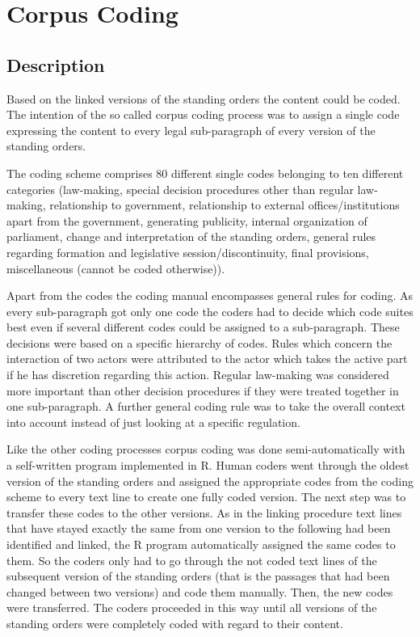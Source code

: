 \documentclass[10pt,]{article}
\begin{document}
\newpage

\section{Corpus Coding}\label{corpus-coding}

\subsection{Description}\label{description-2}

Based on the linked versions of the standing orders the content could be
coded. The intention of the so called corpus coding process was to
assign a single code expressing the content to every legal sub-paragraph
of every version of the standing orders.

The coding scheme comprises 80 different single codes belonging to ten
different categories (law-making, special decision procedures other than
regular law-making, relationship to government, relationship to external
offices/institutions apart from the government, generating publicity,
internal organization of parliament, change and interpretation of the
standing orders, general rules regarding formation and legislative
session/discontinuity, final provisions, miscellaneous (cannot be coded
otherwise)).

Apart from the codes the coding manual encompasses general rules for
coding. As every sub-paragraph got only one code the coders had to
decide which code suites best even if several different codes could be
assigned to a sub-paragraph. These decisions were based on a specific
hierarchy of codes. Rules which concern the interaction of two actors
were attributed to the actor which takes the active part if he has
discretion regarding this action. Regular law-making was considered more
important than other decision procedures if they were treated together
in one sub-paragraph. A further general coding rule was to take the
overall context into account instead of just looking at a specific
regulation.

Like the other coding processes corpus coding was done
semi-automatically with a self-written program implemented in R. Human
coders went through the oldest version of the standing orders and
assigned the appropriate codes from the coding scheme to every text line
to create one fully coded version. The next step was to transfer these
codes to the other versions. As in the linking procedure text lines that
have stayed exactly the same from one version to the following had been
identified and linked, the R program automatically assigned the same
codes to them. So the coders only had to go through the not coded text
lines of the subsequent version of the standing orders (that is the
passages that had been changed between two versions) and code them
manually. Then, the new codes were transferred. The coders proceeded in
this way until all versions of the standing orders were completely coded
with regard to their content.
\end{document}
